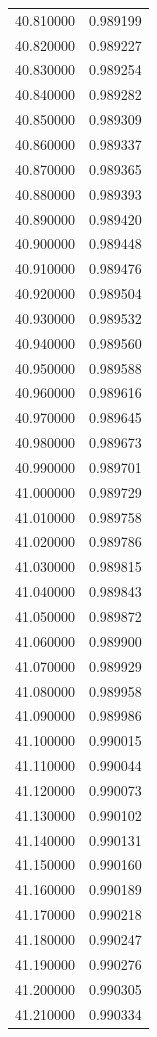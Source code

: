 \begin{tabular}{rr}
40.810000 & 0.989199 \\
40.820000 & 0.989227 \\
40.830000 & 0.989254 \\
40.840000 & 0.989282 \\
40.850000 & 0.989309 \\
40.860000 & 0.989337 \\
40.870000 & 0.989365 \\
40.880000 & 0.989393 \\
40.890000 & 0.989420 \\
40.900000 & 0.989448 \\
40.910000 & 0.989476 \\
40.920000 & 0.989504 \\
40.930000 & 0.989532 \\
40.940000 & 0.989560 \\
40.950000 & 0.989588 \\
40.960000 & 0.989616 \\
40.970000 & 0.989645 \\
40.980000 & 0.989673 \\
40.990000 & 0.989701 \\
41.000000 & 0.989729 \\
41.010000 & 0.989758 \\
41.020000 & 0.989786 \\
41.030000 & 0.989815 \\
41.040000 & 0.989843 \\
41.050000 & 0.989872 \\
41.060000 & 0.989900 \\
41.070000 & 0.989929 \\
41.080000 & 0.989958 \\
41.090000 & 0.989986 \\
41.100000 & 0.990015 \\
41.110000 & 0.990044 \\
41.120000 & 0.990073 \\
41.130000 & 0.990102 \\
41.140000 & 0.990131 \\
41.150000 & 0.990160 \\
41.160000 & 0.990189 \\
41.170000 & 0.990218 \\
41.180000 & 0.990247 \\
41.190000 & 0.990276 \\
41.200000 & 0.990305 \\
41.210000 & 0.990334 \\

\end{tabular}
